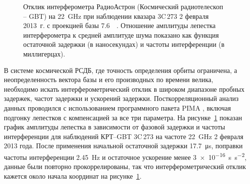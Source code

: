 \begin{figure}[]
\caption{Отклик интерферометра РадиоАстрон (Космический радиотелескоп -- GBT) на \SI{22}{\GHz} при
наблюдении квазара 3C\,273 2 февраля 2013~г. с проекцией базы \SI{7.6}{\giga\la}. Отношение
амплитуды лепестка интерферометра к средней амплитуде шума показано как функция остаточной задержки
(в наносекундах) и частоты интерференции (в миллигерцах).
}
\label{fig:3c273_k_fringe}
\end{figure}

В системе космической РСДБ, где точность определения орбиты ограничена, а неопределенность вектора
базы и его производных по времени велика, необходимо искать интерферометрический отклик в широком
диапазоне пробных задержек, частот задержки и ускорений задержки. Посткорреляционный анализ данных
проводился с использованием программного пакета PIMA \cite{Petrov_2011}, включая подгонку лепестков
с компенсацией за все три параметра. На рисунке~\ref{fig:3c273_k_fringe} показан график амплитуды
лепестка в зависимости от фазовой задержки и частоты интерференции для наблюдений КРТ--GBT 3C\,273
на частоте \SI{22}{\GHz} 2 февраля 2013 года. После применения начальной остаточной задержки
\SI{17.7}{\micro\second}, поправки частоты интерференции \SI{2.45}{\hertz} и остаточное ускорение
менее \SI{3e-16}{\second\per\second^2}, данные были повторно прокоррелированы, так что
интерферометрический отклик кажется около начала координат на рисунке~\ref{fig:3c273_k_fringe}.

